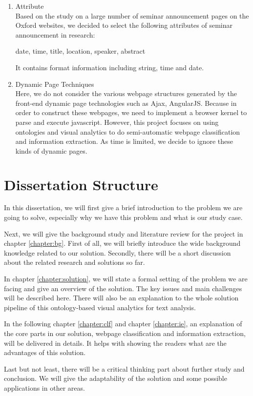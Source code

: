 \begin{enumerate}
	\item Attribute\\
	Based on the study on a large number of seminar announcement pages on the Oxford websites, we decided to select the following attributes of seminar announcement in research:
	\begin{center}
		date, time, title, location, speaker, abstract		
	\end{center}
	It contains format information including string, time and date.
	\item Dynamic Page Techniques\\
	Here, we do not consider the various webpage structures generated by the front-end dynamic page technologies such as Ajax, AngularJS\cite{mesbah2012crawling, grant2014basics}. Because in order to construct these webpages, we need to implement a browser kernel to parse and execute javascript. However, this project focuses on using ontologies and visual analytics to do semi-automatic webpage classification and information extraction. As time is limited, we decide to ignore these kinds of dynamic pages.
\end{enumerate}


\section{Dissertation Structure}
In this dissertation, we will first give a brief introduction to the problem we are going to solve, especially why we have this problem and what is our study case.

Next, we will give the background study and literature review for the project in chapter \ref{chapter:bg}. First of all, we will briefly introduce the wide background knowledge related to our solution. Secondly, there will be a short discussion about the related research and solutions so far.

In chapter \ref{chapter:solution}, we will state a formal setting of the problem we are facing and give an overview of the solution. The key issues and main challenges will be described here. There will also be an explanation to the whole solution pipeline of this ontology-based visual analytics for text analysis.

In the following chapter \ref{chapter:clf} and chapter \ref{chapter:ie}, an explanation of the core parts in our solution, webpage classification and information extraction, will be delivered in details. It helps with showing the readers what are the advantages of this solution.

Last but not least, there will be a critical thinking part about further study and conclusion. We will give the adaptability of the solution and some possible applications in other areas.
